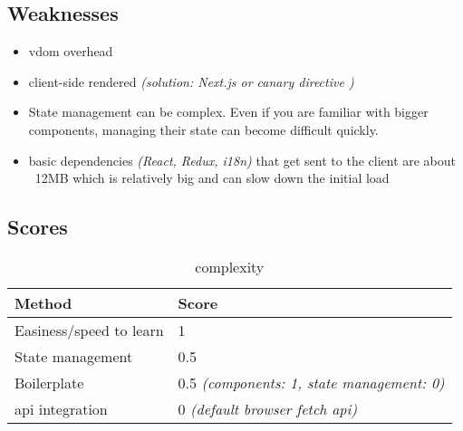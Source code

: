\subsection{Weaknesses}
\label{subsec:react:weaknesses}
\begin{itemize}
    \item \acrshort{vdom} overhead
    \item client-side rendered \textit{(solution: Next.js or canary  directive \cite{react:use_server_directive})}
    \item State management can be complex. Even if you are familiar with bigger components, managing their state can become difficult quickly.
    \item basic dependencies \textit{(React, Redux, \acrshort{i18n})} that get sent to the client are about ~12MB which is relatively big and can slow down the initial load
\end{itemize}

\subsection{Scores}
\label{subsec:react:scores}

\begin{table}[H]
    \centering
    \begin{tabular}{|l|l|}
        \hline
        \textbf{Method}            & \textbf{Score}                                    \\
        \hline
        Easiness/speed to learn    & 1                                                 \\ \hline
        State management           & 0.5                                               \\ \hline
        Boilerplate                & 0.5 \textit{(components: 1, state management: 0)} \\ \hline
        \acrshort{api} integration & 0 \textit{(default browser fetch \acrshort{api})} \\ \hline
    \end{tabular}
    \caption{complexity}
    \label{tab:react:complexity}
\end{table}


